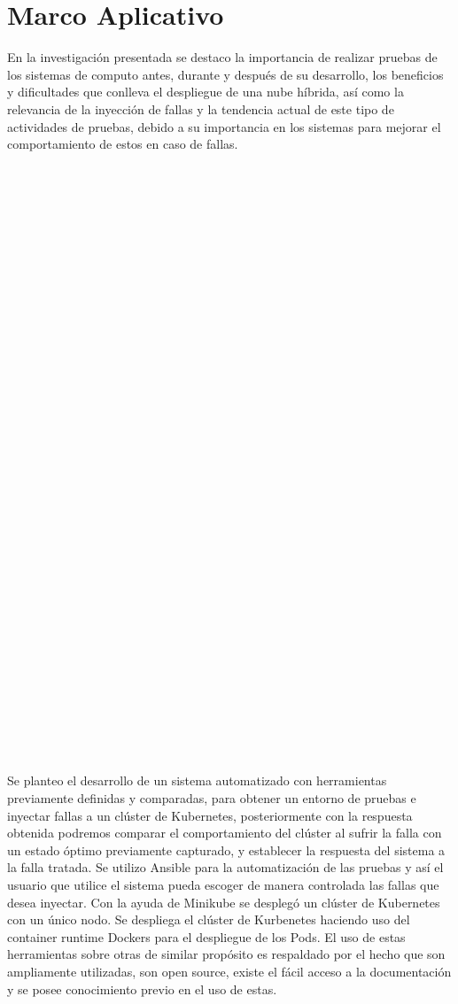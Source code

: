 \chapter{Marco Aplicativo}

\par En la investigación presentada se destaco la importancia de realizar pruebas de los sistemas de computo antes, durante y después de su desarrollo, los beneficios y dificultades que conlleva el despliegue de una nube híbrida, así como la relevancia de la inyección de fallas y la tendencia actual de este tipo de actividades de pruebas, debido a su importancia en los sistemas para mejorar el comportamiento de estos en caso de fallas.\\\\\\\\\\\\\\\\\\\\\\\\\\\\\\\\\\\\\\\\\\\\\\\\\\\\\\\\\\\\\\\\\\\\\\\\
\par Se planteo el desarrollo de un sistema automatizado con herramientas previamente definidas y comparadas, para obtener un entorno de pruebas e inyectar fallas a un clúster de Kubernetes, posteriormente con la respuesta obtenida podremos comparar el comportamiento del clúster al sufrir la falla con un estado óptimo previamente capturado, y establecer la respuesta del sistema a la falla tratada. Se utilizo Ansible para la automatización de las pruebas y así el usuario que utilice el sistema pueda escoger de manera controlada las fallas que desea inyectar. Con la ayuda de Minikube se desplegó un clúster de Kubernetes con un único nodo. Se despliega el clúster de Kurbenetes haciendo uso del container runtime Dockers para el despliegue de los Pods. El uso de estas herramientas sobre otras de similar propósito es respaldado por el hecho que son ampliamente utilizadas, son open source, existe el fácil acceso a la documentación y se posee conocimiento previo en el uso de estas.\\
